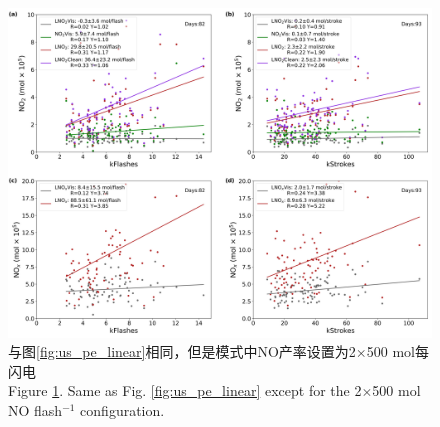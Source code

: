 \vspace{5mm}
\begin{figure}[H]
\centering
\includegraphics[width=\textwidth]{./figures/us_pe_linear_2x500.png}
\caption{与图\ref{fig:us_pe_linear}相同，但是模式中NO产率设置为2$\times$500 mol每闪电 \\Figure \ref{fig:us_pe_linear_2x500}. Same as Fig. \ref{fig:us_pe_linear} except for the 2$\times$500 mol NO flash$^{-1}$ configuration.}
\label{fig:us_pe_linear_2x500}
\end{figure}

